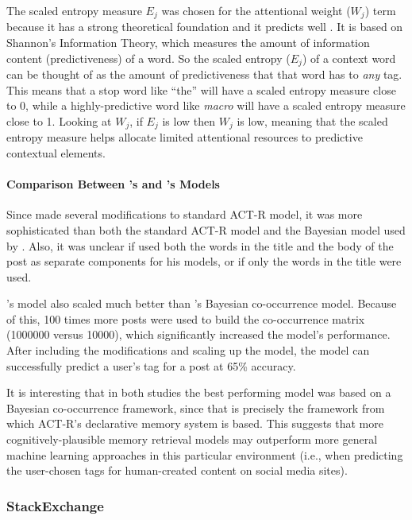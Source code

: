 \documentclass[man,floatsintext,donotrepeattitle]{apa6}
\begin{document}
The scaled entropy measure $E_{j}$ was chosen for the attentional weight ($W_{j}$) term because it has a strong theoretical foundation and it predicts well \parencite{Dumais1991}.
It is based on Shannon's Information Theory, which measures the amount of information content (predictiveness) of a word.
So the scaled entropy ($E_{j}$) of a context word can be thought of as the amount of predictiveness that that word has to \emph{any} tag.
This means that a stop word like ``the'' will have a scaled entropy measure close to 0, while a highly-predictive word like \emph{macro} will have a scaled entropy measure close to 1.
Looking at $W_{j}$, if $E_{j}$ is low then $W_{j}$ is low, meaning that the scaled entropy measure helps allocate limited attentional resources to predictive contextual elements.

\paragraph{Comparison Between \citeauthor{Kuo2011}'s and \citeauthor{Stanley2013}'s Models}

Since \textcite{Stanley2013} made several modifications to standard ACT-R model, it was more sophisticated than both the standard ACT-R model and the Bayesian model used by \textcite{Kuo2011}.
Also, it was unclear if \citeauthor{Kuo2011} used both the words in the title and the body of the post as separate components for his models, or if only the words in the title were used.

\citeauthor{Stanley2013}'s model also scaled much better than \citeauthor{Kuo2011}'s Bayesian co-occurrence model. 
Because of this, 100 times more posts were used to build the co-occurrence matrix (\num{1000000} versus \num{10000}), which significantly increased the model's performance.
After including the modifications and scaling up the model, the model can successfully predict a user's tag for a post at 65\% accuracy.

It is interesting that in both studies the best performing model was based on a Bayesian co-occurrence framework, since that is precisely the framework from which ACT-R's declarative memory system is based.
This suggests that more cognitively-plausible memory retrieval models may outperform more general machine learning approaches in this particular environment
(i.e., when predicting the user-chosen tags for human-created content on social media sites).

\subsubsection{StackExchange}
\end{document}
